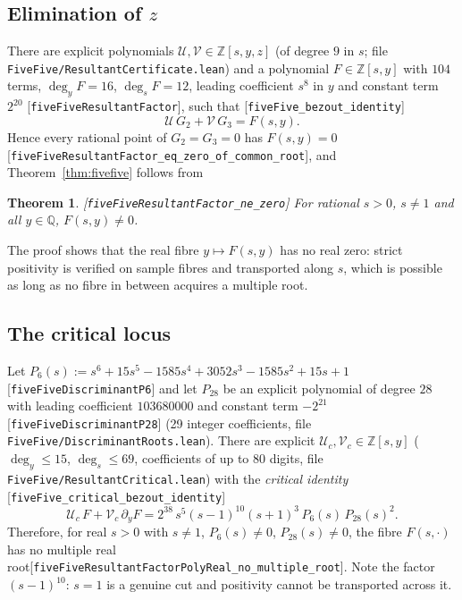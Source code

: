 \documentclass[10pt]{article}
\newtheorem{theorem}{Theorem}[section]
\theoremstyle{definition}
\theoremstyle{remark}
\newcommand{\Q}{\mathbb{Q}}
\newcommand{\Z}{\mathbb{Z}}
\newcommand{\leanref}[1]{{\scriptsize\textup{[\texttt{#1}]}}\allowbreak}
\newcommand{\leanfile}[1]{\texttt{\small #1}}
\begin{document}
\subsection{Elimination of \texorpdfstring{$z$}{z}}

There are explicit polynomials $\mathcal{U},\mathcal{V}\in\Z[s,y,z]$ (of
degree $9$ in $s$; file \leanfile{Five\allowbreak Five/\allowbreak Resultant\allowbreak Certificate.\allowbreak lean}) and a
polynomial $F\in\Z[s,y]$ with $104$ terms, $\deg_yF=16$, $\deg_sF=12$,
leading coefficient $s^8$ in $y$ and constant term $2^{20}$
\leanref{five\allowbreak Five\allowbreak Resultant\allowbreak Factor}, such that
\leanref{five\allowbreak Five\_\allowbreak bezout\_\allowbreak identity}
\[
 \mathcal{U}\,G_2+\mathcal{V}\,G_3=F(s,y).
\]
Hence every
rational point of $G_2=G_3=0$ has $F(s,y)=0$
\leanref{five\allowbreak Five\allowbreak Resultant\allowbreak Factor\_\allowbreak eq\_\allowbreak zero\_\allowbreak of\_\allowbreak common\_\allowbreak root}, and
Theorem~\ref{thm:fivefive} follows from
\begin{theorem}\label{thm:Fnonzero}
\leanref{five\allowbreak Five\allowbreak Resultant\allowbreak Factor\_\allowbreak ne\_\allowbreak zero}
For rational $s>0$, $s\ne1$ and all $y\in\Q$, $F(s,y)\ne0$.
\end{theorem}
The proof shows that the real fibre $y\mapsto F(s,y)$ has no real zero: strict
positivity is verified on sample fibres and transported along $s$, which is
possible as long as no fibre in between acquires a multiple root.

\subsection{The critical locus}

Let $P_6(s):=s^6+15s^5-1585s^4+3052s^3-1585s^2+15s+1$
\leanref{five\allowbreak Five\allowbreak Discriminant\allowbreak P6} and let $P_{28}$ be an explicit polynomial of
degree $28$ with leading coefficient $103680000$ and constant term $-2^{21}$
\leanref{five\allowbreak Five\allowbreak Discriminant\allowbreak P28} (29 integer coefficients, file
\leanfile{Five\allowbreak Five/\allowbreak Discriminant\allowbreak Roots.\allowbreak lean}).  There are explicit
$\mathcal{U}_c,\mathcal{V}_c\in\Z[s,y]$ ($\deg_y\le15$, $\deg_s\le69$,
coefficients of up to $80$ digits, file \leanfile{Five\allowbreak Five/\allowbreak Resultant\allowbreak Critical.\allowbreak lean})
with the \emph{critical identity} \leanref{five\allowbreak Five\_\allowbreak critical\_\allowbreak bezout\_\allowbreak identity}
\begin{equation}\label{eq:critical}
 \mathcal{U}_c\,F+\mathcal{V}_c\,\partial_yF=2^{38}\,s^5(s-1)^{10}(s+1)^3\,P_6(s)\,P_{28}(s)^2 .
\end{equation}
Therefore, for real $s>0$ with $s\ne1$, $P_6(s)\ne0$, $P_{28}(s)\ne0$, the fibre
$F(s,\cdot)$ has no multiple real root\leanref{five\allowbreak Five\allowbreak Resultant\allowbreak Factor\allowbreak Poly\allowbreak Real\_\allowbreak no\_\allowbreak multiple\_\allowbreak root}.
Note the factor $(s-1)^{10}$: $s=1$ is a genuine cut and positivity cannot be
transported across it.
\end{document}
